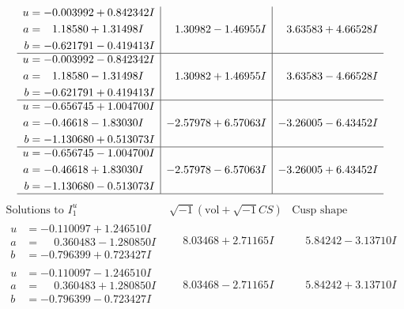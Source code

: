 \documentclass[1p]{elsarticle_modified}
\theoremstyle{definition}
\newcommand{\I}{\sqrt{-1}}
\begin{document}
$$\begin{array}{c|c|c}
\begin{aligned}
u &= -0.003992 + 0.842342 I \\
a &= \phantom{-}1.18580 + 1.31498 I \\
b &= -0.621791 - 0.419413 I\end{aligned}
 & \phantom{-}1.30982 - 1.46955 I & \phantom{-}3.63583 + 4.66528 I \\ \hline\begin{aligned}
u &= -0.003992 - 0.842342 I \\
a &= \phantom{-}1.18580 - 1.31498 I \\
b &= -0.621791 + 0.419413 I\end{aligned}
 & \phantom{-}1.30982 + 1.46955 I & \phantom{-}3.63583 - 4.66528 I \\ \hline\begin{aligned}
u &= -0.656745 + 1.004700 I \\
a &= -0.46618 - 1.83030 I \\
b &= -1.130680 + 0.513073 I\end{aligned}
 & -2.57978 + 6.57063 I & -3.26005 - 6.43452 I \\ \hline\begin{aligned}
u &= -0.656745 - 1.004700 I \\
a &= -0.46618 + 1.83030 I \\
b &= -1.130680 - 0.513073 I\end{aligned}
 & -2.57978 - 6.57063 I & -3.26005 + 6.43452 I\\
 \hline 
 \end{array}$$\newpage$$\begin{array}{c|c|c}  
\text{Solutions to }I^u_{1}& \I (\text{vol} + \sqrt{-1}CS) & \text{Cusp shape}\\
 \hline 
\begin{aligned}
u &= -0.110097 + 1.246510 I \\
a &= \phantom{-}0.360483 - 1.280850 I \\
b &= -0.796399 + 0.723427 I\end{aligned}
 & \phantom{-}8.03468 + 2.71165 I & \phantom{-}5.84242 - 3.13710 I \\ \hline\begin{aligned}
u &= -0.110097 - 1.246510 I \\
a &= \phantom{-}0.360483 + 1.280850 I \\
b &= -0.796399 - 0.723427 I\end{aligned}
 & \phantom{-}8.03468 - 2.71165 I & \phantom{-}5.84242 + 3.13710 I \\ \hline\begin{aligned}

\end{aligned}
\end{array}$$
\end{document}
